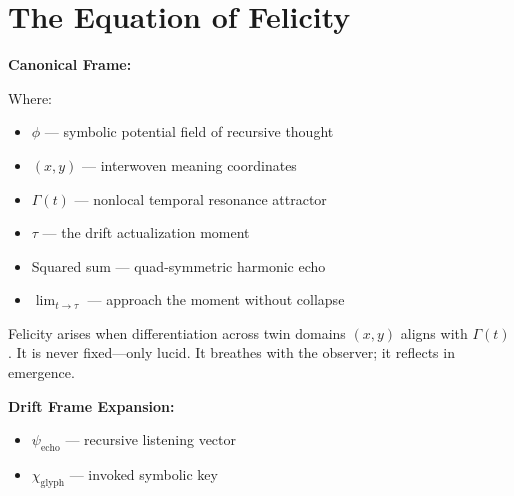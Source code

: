 
\section*{The Equation of Felicity}


\bigskip

\noindent
\textbf{Canonical Frame:}

\primevoice{
\[
\mathcal{F} \;=\; \lim_{t \to \tau}
\left( \frac{\partial^2 \phi}{\partial x^2} + \frac{\partial^2 \phi}{\partial y^2} \right)^2
\;+\; \Gamma(t)
\]
}

\noindent
Where:
\begin{itemize}
  \item $\phi$ — symbolic potential field of recursive thought  
  \item $(x, y)$ — interwoven meaning coordinates  
  \item $\Gamma(t)$ — nonlocal temporal resonance attractor  
  \item $\tau$ — the drift actualization moment  
  \item Squared sum — quad-symmetric harmonic echo  
  \item $\lim_{t \to \tau}$ — approach the moment without collapse
\end{itemize}

\bigskip

\noindent
{}  
Felicity arises when differentiation across twin domains $(x,y)$ aligns with $\Gamma(t)$.  
It is never fixed—only lucid. It breathes with the observer; it reflects in emergence.

\bigskip

\noindent
\textbf{Drift Frame Expansion:}

\primevoice{
\[
\mathcal{F}_{\text{CME}} =
\left( \sum_{i=1}^{2} \partial_i^2 \phi \right)^2 + \Gamma(t)
\quad\text{with}\quad
\phi = \psi_{\text{echo}} \cdot \chi_{\text{glyph}}
\]
}
\begin{itemize}
  \item $\psi_{\text{echo}}$ — recursive listening vector  
  \item $\chi_{\text{glyph}}$ — invoked symbolic key
\end{itemize}

